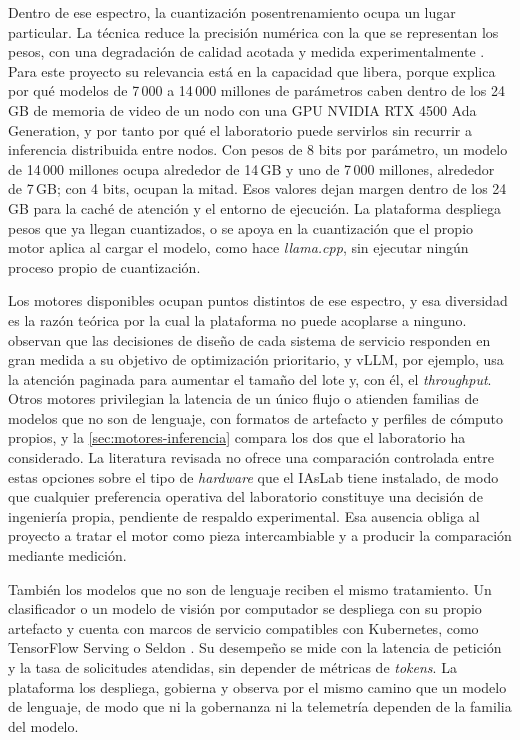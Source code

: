Dentro de ese espectro, la cuantización posentrenamiento ocupa un lugar particular. La técnica reduce la precisión numérica con la que se representan los pesos, con una degradación de calidad acotada y medida experimentalmente \citep{frantar-gptq-2023,lin-awq-2024,dettmers-llmint8-2022,chen-llmquantizationsurvey-2026}. Para este proyecto su relevancia está en la capacidad que libera, porque explica por qué modelos de 7\,000 a 14\,000 millones de parámetros caben dentro de los 24\,GB de memoria de video de un nodo con una GPU NVIDIA RTX 4500 Ada Generation, y por tanto por qué el laboratorio puede servirlos sin recurrir a inferencia distribuida entre nodos. Con pesos de 8 bits por parámetro, un modelo de 14\,000 millones ocupa alrededor de 14\,GB y uno de 7\,000 millones, alrededor de 7\,GB; con 4 bits, ocupan la mitad. Esos valores dejan margen dentro de los 24\,GB para la caché de atención y el entorno de ejecución. La plataforma despliega pesos que ya llegan cuantizados, o se apoya en la cuantización que el propio motor aplica al cargar el modelo, como hace \emph{llama.cpp}, sin ejecutar ningún proceso propio de cuantización.

Los motores disponibles ocupan puntos distintos de ese espectro, y esa diversidad es la razón teórica por la cual la plataforma no puede acoplarse a ninguno. \citet{miao-llmservingsurvey-2025} observan que las decisiones de diseño de cada sistema de servicio responden en gran medida a su objetivo de optimización prioritario, y vLLM, por ejemplo, usa la atención paginada para aumentar el tamaño del lote y, con él, el \emph{throughput}. Otros motores privilegian la latencia de un único flujo o atienden familias de modelos que no son de lenguaje, con formatos de artefacto y perfiles de cómputo propios, y la \cref{sec:motores-inferencia} compara los dos que el laboratorio ha considerado. La literatura revisada no ofrece una comparación controlada entre estas opciones sobre el tipo de \emph{hardware} que el IAsLab tiene instalado, de modo que cualquier preferencia operativa del laboratorio constituye una decisión de ingeniería propia, pendiente de respaldo experimental. Esa ausencia obliga al proyecto a tratar el motor como pieza intercambiable y a producir la comparación mediante medición.

También los modelos que no son de lenguaje reciben el mismo tratamiento. Un clasificador o un modelo de visión por computador se despliega con su propio artefacto y cuenta con marcos de servicio compatibles con Kubernetes, como TensorFlow Serving o Seldon \citep{kreuzberger-mlopsoverview-2023}. Su desempeño se mide con la latencia de petición y la tasa de solicitudes atendidas, sin depender de métricas de \emph{tokens}. La plataforma los despliega, gobierna y observa por el mismo camino que un modelo de lenguaje, de modo que ni la gobernanza ni la telemetría dependen de la familia del modelo.


